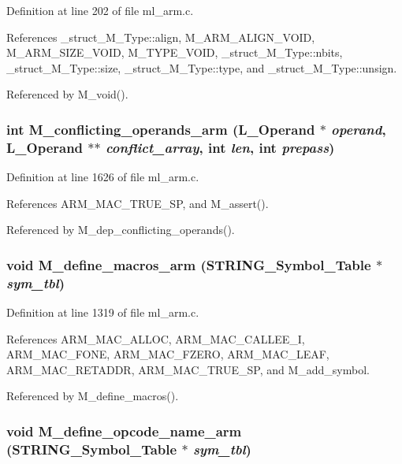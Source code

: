 Definition at line 202 of file ml\_\-arm.c.

References \_\-struct\_\-M\_\-Type::align, M\_\-ARM\_\-ALIGN\_\-VOID, M\_\-ARM\_\-SIZE\_\-VOID, M\_\-TYPE\_\-VOID, \_\-struct\_\-M\_\-Type::nbits, \_\-struct\_\-M\_\-Type::size, \_\-struct\_\-M\_\-Type::type, and \_\-struct\_\-M\_\-Type::unsign.

Referenced by M\_\-void().
\subsubsection{\setlength{\rightskip}{0pt plus 5cm}int M\_\-conflicting\_\-operands\_\-arm (L\_\-Operand $\ast$ {\em operand}, L\_\-Operand $\ast$$\ast$ {\em conflict\_\-array}, int {\em len}, int {\em prepass})}\label{m__arm_8h_3860d76738ffb1104d4576589a861549}




Definition at line 1626 of file ml\_\-arm.c.

References ARM\_\-MAC\_\-TRUE\_\-SP, and M\_\-assert().

Referenced by M\_\-dep\_\-conflicting\_\-operands().
\subsubsection{\setlength{\rightskip}{0pt plus 5cm}void M\_\-define\_\-macros\_\-arm (\bf{STRING\_\-Symbol\_\-Table} $\ast$ {\em sym\_\-tbl})}\label{m__arm_8h_a68abfe8777c96a9794a7226c8469c05}




Definition at line 1319 of file ml\_\-arm.c.

References ARM\_\-MAC\_\-ALLOC, ARM\_\-MAC\_\-CALLEE\_\-I, ARM\_\-MAC\_\-FONE, ARM\_\-MAC\_\-FZERO, ARM\_\-MAC\_\-LEAF, ARM\_\-MAC\_\-RETADDR, ARM\_\-MAC\_\-TRUE\_\-SP, and M\_\-add\_\-symbol.

Referenced by M\_\-define\_\-macros().
\subsubsection{\setlength{\rightskip}{0pt plus 5cm}void M\_\-define\_\-opcode\_\-name\_\-arm (\bf{STRING\_\-Symbol\_\-Table} $\ast$ {\em sym\_\-tbl})}\label{m__arm_8h_f770720b2bce403c4540ced8471204bd}




